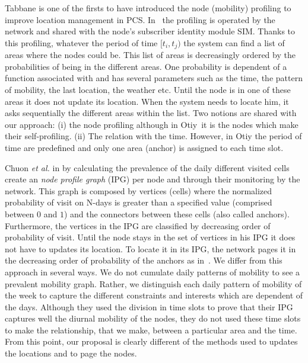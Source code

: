 \documentclass[a4paper]{sig-alternate-10pt}
\newcommand{\otiy}{{\sffamily Otiy}}
\begin{document}
Tabbane is one of the firsts to have introduced the node (mobility)
profiling to improve location management in \textsc{PCS}.
In~\cite{tabbane} the profiling is operated by the network and
shared with the node's subscriber identity module \textsc{SIM}.
Thanks to this profiling, whatever the period of time $[t_i,t_j)$
the system can find a list of areas where the nodes could be. This
list of areas is decreasingly ordered by the probabilities of being
in the different areas. One probability is dependent of a function
associated with and has several parameters such as the time, the
pattern of mobility, the last location, the weather etc. Until the
node is in one of these areas it does not update its location. When
the system needs to locate him, it asks sequentially the different
areas within the list. Two notions are shared with our approach: (i)
the node profiling although in \otiy\ it is the nodes which make
their self-profiling. (ii) The relation with the time. However, in
Otiy the period of time are predefined and only one area (anchor) is
assigned to each time slot.


Chuon \textit{et al.} in \cite{chuon} by calculating the prevalence
of the daily different visited cells create an \textit{node
profile graph} (\textsc{IPG}) per node and through their monitoring
by the network. This graph is composed by vertices (cells) where the
normalized probability of visit on N-days is greater than a
specified value (comprised between $0$ and $1$) and the connectors
between these cells (also called anchors). Furthermore, the vertices
in the \textsc{IPG} are classified by decreasing order of
probability of visit. Until the node stays in the set of vertices in
his \textsc{IPG} it does not have to updates its location. To locate
it in its \textsc{IPG}, the network pages it in the decreasing
order of probability of the anchors as in~\cite{pollini}. We differ
from this approach in several ways. We do not cumulate daily
patterns of mobility to see a prevalent mobility graph. Rather, we
distinguish each daily pattern of mobility of the week to capture
the different constraints and interests which are dependent of the
days. Although they used the division in time slots to prove that
their \textsc{IPG} captures well the diurnal mobility of the nodes,
they do not used these time slots to make the relationship, that we
make, between a particular area and the time. From this point, our
proposal is clearly different of the methods used to updates the
locations and to page the nodes.
\end{document}
